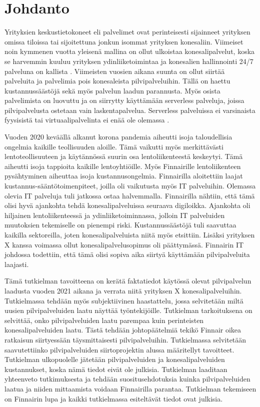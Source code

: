 \chapter{Johdanto\label{johdanto}}
Yrityksien keskustietokoneet eli palvelimet ovat perinteisesti sijainneet yrityksen omissa tiloissa tai sijoitettuna jonkun isommat yrityksen konesaliin. Viimeiset noin kymmenen vuotta yleisenä mallina on ollut ulkoistaa konesalipalvelut, koska se harvemmin kuuluu yrityksen ydinliiketoimintaa ja konesalien hallinnointi 24/7 palveluna on kallista \citep{data_center_outsourcing}. Viimeisten vuosien aikana suunta on ollut siirtää palveluita ja palvelimia pois konesaleista pilvipalveluihin. Tällä on haettu kustannussäästöjä sekä myös palvelun laadun parannusta. Myös osista palvelimista on luovuttu ja on siirrytty käyttämään serverless palveluja, joissa pilvipalvelusta ostetaan vain laskentapalvelua. Serverless palveluissa ei varsinaista fyysisistä tai virtuaalipalvelinta ei enää ole olemassa \citep{serverless_computing}.


Vuoden 2020 keväällä alkanut korona pandemia aiheutti isoja taloudellisia ongelmia kaikille teollisuuden aloille. Tämä vaikutti myös merkittävästi lentoteollisuuteen ja käytännössä suurin osa lentoliikenteestä keskeytyi. Tämä aiheutti isoja tappioita kaikille lentoyhtiöille. Myös Finnairille lentoliikenteen pysähtyminen aiheuttaa isoja kustannusongelmia. Finnairilla aloitettiin laajat kustannus-sääntötoimenpiteet, joilla oli vaikutusta myös IT palveluihin. Olemassa olevia IT palveluja tuli jatkossa ostaa halvemmalla. Finnairilla nähtiin, että tämä olisi hyvä ajankohta tehdä konesalipalveluissa seuraava digiloikka. Ajankohta oli hiljainen lentoliikenteessä ja ydinliiketoiminnassa, jolloin IT palveluiden muutoksien tekemiselle on pienempi riski. Kustannussäästöjä tuli saavuttaa kaikilla sektoreilla, joten konesalipalveluista niitä myös etsittiin. Lisäksi yrityksen X kanssa voimassa ollut konesalipalvelusopimus oli päättymässä. Finnairin IT johdossa todettiin, että tämä olisi sopiva aika siirtyä käyttämään pilvipalveluita laajasti. \citep{finnair_use_ibm}

Tämä tutkielman tavoitteena on kerätä faktatiedot käytössä olevat pilvipalvelun laadusta vuoden 2021 aikana ja verrata niitä yrityksen X konesalipalveluihin. Tutkielmassa tehdään myös subjektiivinen haastattelu, jossa selvitetään miltä uusien pilvipalveluiden laatu näyttää työntekijöille. Tutkielman tarkoituksena on selvittää, onko pilvipalveluiden laatu parempaa kuin perinteisten konesalipalveluiden laatu. Tästä tehdään johtopäätelmiä tekikö Finnair oikea ratkaisun siirtyessään täysmittaisesti pilvipalveluihin. Tutkielmassa selvitetään saavutettiinko pilvipalveluiden siirtoprojektin alussa määritellyt tavoitteet. Tutkielman ulkopuolelle jätetään pilvipalveluiden ja konesalipalveluiden kustannukset, koska nämä tiedot eivät ole julkisia. Tutkielman laaditaan yhteenveto tutkimuksesta ja tehdään suositusehdotuksia kuinka pilvipalveluiden laatua ja niiden mittaamista voidaan Finnairilla parantaa. Tutkielman tekemiseen on Finnairin lupa ja kaikki tutkielmassa esiteltävät tiedot ovat julkisia.

